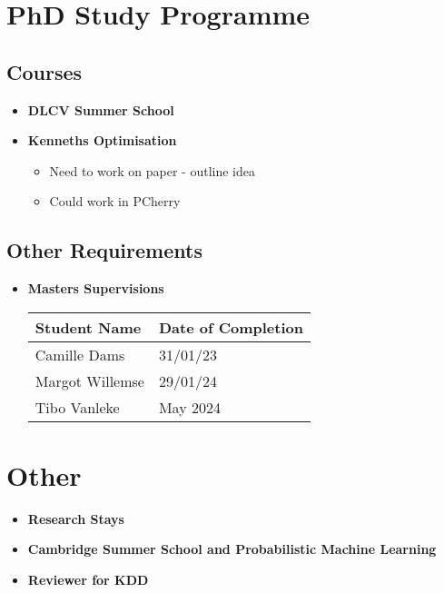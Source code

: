 \section{PhD Study Programme}

\subsection{Courses}

\begin{itemize}
    \item \textbf{DLCV Summer School}
    \item \textbf{Kenneths Optimisation}
    \begin{itemize}
        \item Need to work on paper - outline idea
        \item Could work in PCherry
    \end{itemize}
\end{itemize}

\subsection{Other Requirements}

\begin{itemize}
    \item \textbf{Masters Supervisions}
    \begin{table}[h]
    \centering
    \begin{tabular}{|l|l|}
        \hline
        \textbf{Student Name} & \textbf{Date of Completion} \\ \hline
        Camille Dams & 31/01/23 \\ \hline
        Margot Willemse & 29/01/24 \\ \hline
        Tibo Vanleke & May 2024 \\ \hline
    \end{tabular}
\end{table}
\end{itemize}

\section{Other}

\begin{itemize}
    \item \textbf{Research Stays}
    \item \textbf{Cambridge Summer School and Probabilistic Machine Learning}
    \item \textbf{Reviewer for KDD}
\end{itemize}

